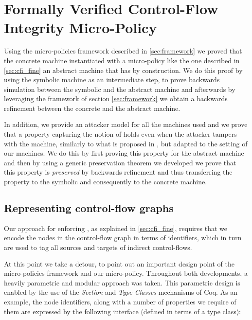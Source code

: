 \chapter{Formally Verified Control-Flow Integrity Micro-Policy}
\label{ch:verified_cfi}

Using the micro-policies framework described in \ref{sec:framework} we
proved that the concrete machine instantiated with a \CFI micro-policy
like the one described in \ref{sec:cfi_fine}  an
abstract machine that has \CFI by construction. We do this proof by
using the symbolic machine as an intermediate step, to prove backwards
simulation between the symbolic and the abstract machine and
afterwards by leveraging the framework of section \ref{sec:framework}
we obtain a backwards refinement between the concrete and the abstract
machine.

In addition, we provide an attacker model for all the machines used
and we prove that a property capturing the notion of \CFI holds even
when the attacker tampers with the machine, similarly to what is
proposed in \cite{AbadiBEL09}, but adapted to the setting of our
machines. We do this by first proving this property for the
abstract machine and then by using a generic preservation theorem
we developed we prove that this property is \emph{preserved} by
backwards refinement and thus transferring the property to the
symbolic and consequently to the concrete machine.

\section{Representing control-flow graphs}\label{sec:cfi_tags}

Our approach for enforcing \CFI, as explained in \ref{sec:cfi_fine},
requires that we encode the nodes in the control-flow graph in terms
of identifiers, which in turn are used to tag all sources and targets
of indirect control-flows.

At this point we take a detour, to point out an important design point
of the micro-policies framework and our \CFI micro-policy.  Throughout
both developments, a heavily parametric and modular approach was
taken. This parametric design is enabled by the use of the
\emph{Section} and \emph{Type Classes} mechanisms of Coq. As an
example, the node identifiers, along with a number of properties we
require of them are expressed by the following interface (defined in
terms of a type class):

